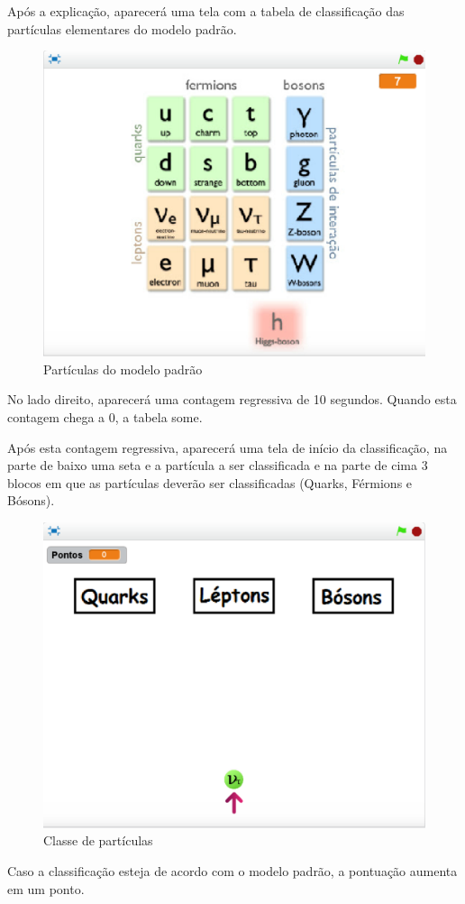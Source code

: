 \documentclass[12pt,fleqn]{book} %
\begin{document}
\newpage

Após a explicação, aparecerá uma tela com a tabela de classificação das partículas elementares do modelo padrão.

\begin{figure}[h]
	\centering
	\includegraphics[width=0.65 \textwidth]{Produto/class2}
	\caption{Partículas do modelo padrão}
	\label{fig:app_a:class2}
\end{figure}

No lado direito, aparecerá uma contagem regressiva de 10 segundos. Quando esta contagem chega a 0, a tabela some.

Após esta contagem regressiva, aparecerá uma tela de início da classificação, na parte de baixo uma seta e a partícula a ser classificada e na parte de cima 3 blocos em que as partículas deverão ser classificadas (Quarks, Férmions e Bósons).

\begin{figure}[h]
	\centering
	\includegraphics[width=0.63 \textwidth]{Produto/class3}
	\caption{Classe de partículas}
	\label{fig:app_a:class3}
\end{figure}

\newpage

Caso a classificação esteja de acordo com o modelo padrão, a pontuação aumenta em um ponto.
\end{document}
